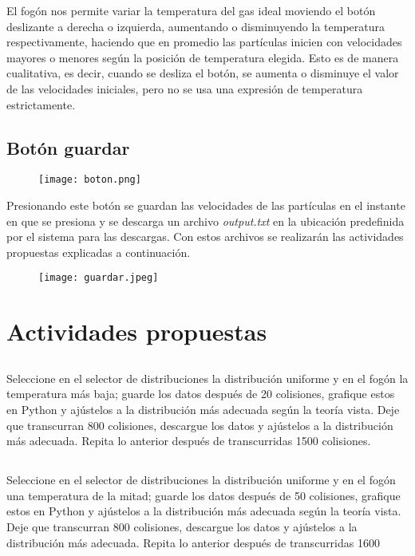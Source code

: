 \documentclass[11pt]{article}
\begin{document}
El fogón nos permite variar la temperatura del gas ideal moviendo el botón deslizante a derecha o izquierda, aumentando o disminuyendo la temperatura respectivamente, haciendo que en promedio las partículas inicien con velocidades mayores o menores según la posición de temperatura elegida. Esto es de manera cualitativa, es decir, cuando se desliza el botón, se aumenta o disminuye el valor de las velocidades iniciales, pero no se usa una expresión de temperatura estrictamente.

\subsection{Botón guardar}
\begin{figure}[H]
\centerline{\texttt{[image: boton.png]}}
\end{figure}

Presionando este botón se guardan las velocidades de las partículas en el instante en que se presiona y se descarga un archivo \textit{output.txt} en la ubicación predefinida por el sistema para las descargas. Con estos archivos se realizarán las actividades propuestas explicadas a continuación.

\begin{figure}[H]
\centerline{\texttt{[image: guardar.jpeg]}}
\end{figure}


\section{Actividades propuestas}

\subsection{}
Seleccione en el selector de distribuciones la distribución uniforme y en el fogón la temperatura más baja; guarde los datos después de 20 colisiones, grafique estos en Python y ajústelos a la distribución más adecuada según la teoría vista. Deje que transcurran 800 colisiones, descargue los datos y ajústelos a la distribución más adecuada. Repita lo anterior después de transcurridas 1500 colisiones.  

\subsection{}
Seleccione en el selector de distribuciones la distribución uniforme y en el fogón una temperatura de la mitad; guarde los datos después de 50 colisiones, grafique estos en Python y ajústelos a la distribución más adecuada según la teoría vista. Deje que transcurran 800 colisiones, descargue los datos y ajústelos a la distribución más adecuada. Repita lo anterior después de transcurridas 1600
\end{document}

